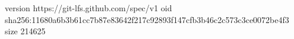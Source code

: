 version https://git-lfs.github.com/spec/v1
oid sha256:11680a6b3b61cc7b87e83642f217c92893f147cfb3b46c2c573c3ce0072be4f3
size 214625
